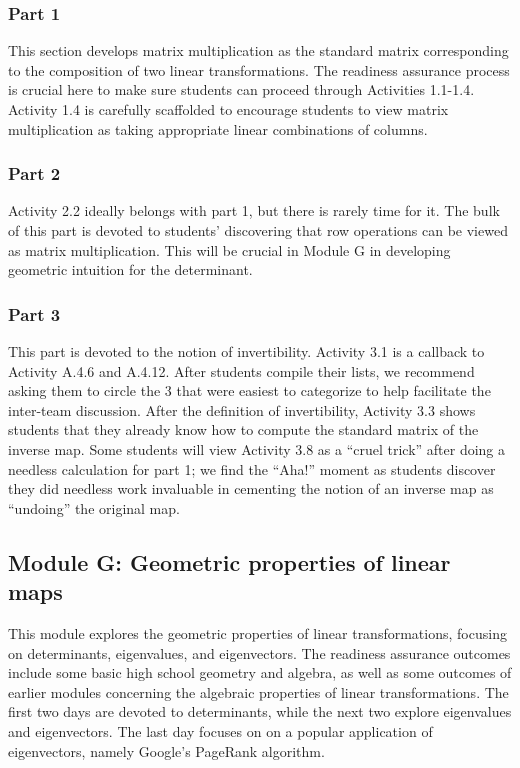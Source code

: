 \documentclass{article}
\begin{document}
\subsubsection*{Part 1}
This section develops matrix multiplication as the standard matrix corresponding to the composition of two linear transformations.  The readiness assurance process is crucial here to make sure students can proceed through Activities 1.1-1.4.  Activity 1.4 is carefully  scaffolded to encourage students to view matrix multiplication as taking appropriate linear combinations of columns. 

\subsubsection*{Part 2}
Activity 2.2 ideally belongs with part 1, but there is rarely time for it.  The bulk of this part is devoted to students' discovering that row operations can be viewed as matrix multiplication.  This will be crucial in Module G in developing geometric intuition for the determinant.  

\subsubsection*{Part 3}
This part is devoted to the notion of invertibility.  Activity 3.1 is a callback to Activity A.4.6 and A.4.12.  After students compile their lists, we recommend asking them to circle the 3 that were easiest to categorize to help facilitate the inter-team discussion.   After the definition of invertibility, Activity 3.3 shows students that they already know how to compute the standard matrix of the inverse map.  Some students will view Activity 3.8 as a ``cruel trick'' after doing a needless calculation for part 1; we find the ``Aha!'' moment as students discover they did needless work invaluable in cementing the notion of an inverse map as ``undoing'' the original map.

\subsection*{Module G: Geometric properties of linear maps}

This module explores the geometric properties of linear transformations, focusing on determinants, eigenvalues, and eigenvectors.  The readiness assurance outcomes include some basic high school geometry and algebra, as well as some outcomes of earlier modules concerning the algebraic properties of linear transformations.  The first two days are devoted to determinants, while the next two explore eigenvalues and eigenvectors.  The last day focuses on on a popular application of eigenvectors, namely Google's PageRank algorithm.
\end{document}
